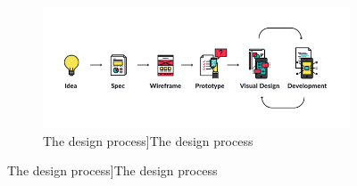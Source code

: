     
\begin{figure}
 \begin{subfigure}{\textwidth}
    \centering
        \includegraphics[width=1\linewidth]{images/ch3/design-process-preview-650px-opt.png} 
            \caption{The design process]{The design process }\label{fig: The design process}}

    \end{subfigure}
\par


\end{figure}
